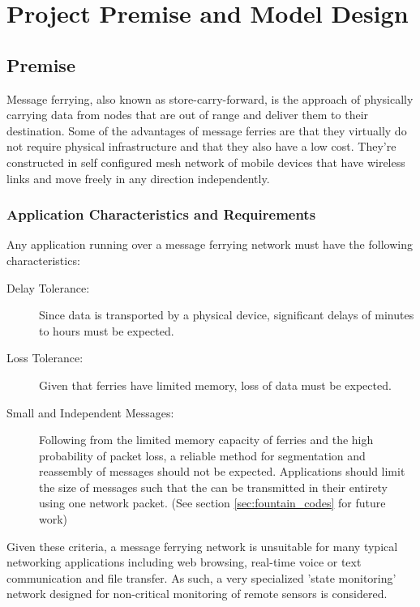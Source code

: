 \chapter{Project Premise and Model Design} 

\section{Premise}



Message ferrying, also known as store-carry-forward, is the approach of physically carrying data from nodes that are out of range and deliver them to their destination. 
Some of the advantages of message ferries are that they virtually do not require physical infrastructure and that they also have a low cost. 
They're constructed in self configured mesh network of mobile devices that have wireless links and move freely in any direction independently. 
	
\subsection{Application Characteristics and Requirements}

Any application running over a message ferrying network must have the following characteristics:

\begin{description}
\item[Delay Tolerance: ]
Since data is transported by a physical device, significant delays of minutes to hours must be expected.
\item[Loss Tolerance: ]
Given that ferries have limited memory, loss of data must be expected.
\item[Small and Independent Messages: ]
Following from the limited memory capacity of ferries and the high probability of packet loss, a reliable method for segmentation and reassembly of messages should not be expected. 
Applications should limit the size of messages such that the can be transmitted in their entirety using one network packet.
%
(See section \ref{sec:fountain_codes} for future work)
\end{description}

Given these criteria, a message ferrying network is unsuitable for many typical networking applications including web browsing, real-time voice or text communication and file transfer.
As such, a very specialized 'state monitoring' network designed for non-critical monitoring of remote sensors is considered.

